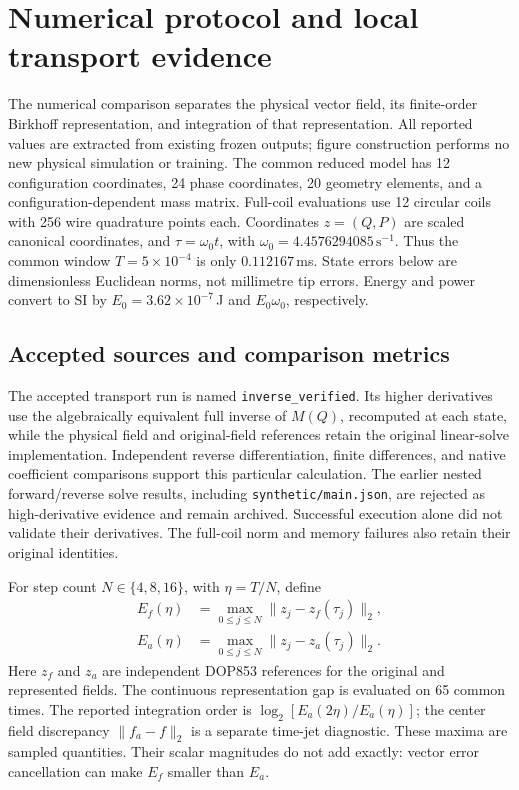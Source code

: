\section{Numerical protocol and local transport evidence}
\label{sec:numerical}

The numerical comparison separates the physical vector field, its finite-order
Birkhoff representation, and integration of that representation. All reported
values are extracted from existing frozen outputs; figure construction performs
no new physical simulation or training. The common reduced model has 12
configuration coordinates, 24 phase coordinates, 20 geometry elements, and a
configuration-dependent mass matrix. Full-coil evaluations use 12 circular coils
with 256 wire quadrature points each. Coordinates $z=(Q,P)$ are scaled canonical
coordinates, and $\tau=\omega_0t$, with
$\omega_0=4.4576294085\,\mathrm{s}^{-1}$. Thus the common window
$T=5\times10^{-4}$ is only $0.112167$\,ms. State errors below are dimensionless
Euclidean norms, not millimetre tip errors. Energy and power convert to SI by
$E_0=3.62\times10^{-7}$\,J and $E_0\omega_0$, respectively.

\subsection{Accepted sources and comparison metrics}

The accepted transport run is named \texttt{inverse\_verified}. Its higher
derivatives use the algebraically equivalent full inverse of $M(Q)$, recomputed
at each state, while the physical field and original-field references retain
the original linear-solve implementation. Independent reverse differentiation,
finite differences, and native coefficient comparisons support this particular
calculation. The earlier nested forward/reverse solve results, including
\texttt{synthetic/main.json}, are rejected as high-derivative evidence and remain
archived. Successful execution alone did not validate their derivatives. The
full-coil norm and memory failures also retain their original identities.

For step count $N\in\{4,8,16\}$, with $\eta=T/N$, define
\begin{equation}
 \begin{aligned}
 E_f(\eta)&=\max_{0\leq j\leq N}\|z_j-z_f(\tau_j)\|_2,\\
 E_a(\eta)&=\max_{0\leq j\leq N}\|z_j-z_a(\tau_j)\|_2.
 \end{aligned}
 \label{eq:numerical-errors}
\end{equation}
Here $z_f$ and $z_a$ are independent DOP853 references for the original and
represented fields. The continuous representation gap is evaluated on 65 common
times. The reported integration order is $\log_2[E_a(2\eta)/E_a(\eta)]$; the center
field discrepancy $\|f_a-f\|_2$ is a separate time-jet diagnostic. These maxima
are sampled quantities. Their scalar magnitudes do not add exactly: vector
error cancellation can make $E_f$ smaller than $E_a$.

